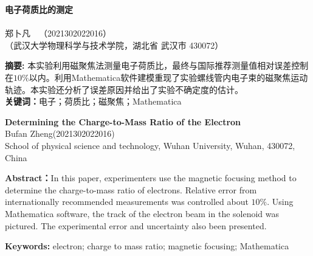 \documentclass{WHUReport}
\newcommand{\name}{郑卜凡}
\newcommand{\stuid}{2021302022016}
\newcommand{\Name}{Bufan Zheng}
\newcommand{\newtitle}{电子荷质比的测定}
\newcommand{\Title}{Determining the Charge-to-Mass Ratio of the Electron
}
\begin{document}
\pagestyle{maincontent} 
%

\begin{center}
 \textbf{\newtitle}\\
~\\
 \kaishu \name \ \ （\stuid）\\
 \kaishu （武汉大学物理科学与技术学院，湖北省 武汉市 430072）\\
\end{center}
\textbf{摘\quad 要:}
本实验利用磁聚焦法测量电子荷质比，最终与国际推荐测量值相对误差控制在$10\%$以内。利用Mathematica软件建模重现了实验螺线管内电子束的磁聚焦运动轨迹。本实验还分析了误差原因并给出了实验不确定度的估计。\\
\textbf{关键词：}电子；荷质比；磁聚焦；Mathematica
~\\
\begin{center}
	\textbf{\Title}\\
	 \Name\quad (\stuid)\\
	 School of physical science and technology, Wuhan University, Wuhan, 430072, China
\end{center}

\textbf{Abstract：}In this paper, experimenters use the magnetic focusing method to determine the charge-to-mass ratio of electrons. Relative error from internationally recommended measurements was controlled about $10\%$. Using Mathematica software, the track of the electron beam in the solenoid was pictured. The experimental error and uncertainty also been presented.

\textbf{Keywords: }electron; charge to mass ratio; magnetic focusing; Mathematica
\end{document}

